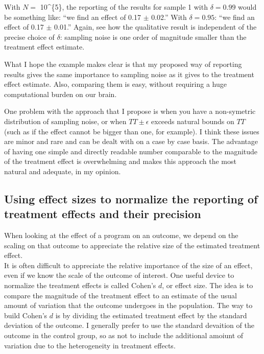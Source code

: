 \documentclass[]{book}
\theoremstyle{definition}
\theoremstyle{definition}
\theoremstyle{definition}
\theoremstyle{remark}
\let\BeginKnitrBlock\begin \let\EndKnitrBlock\end
\begin{document}
With \(N=\) 10\^{}\{5\}, the reporting of the results for sample 1 with
\(\delta=0.99\) would be something like: ``we find an effect of 0.17
\(\pm\) 0.02.'' With \(\delta=0.95\): ``we find an effect of 0.17
\(\pm\) 0.01.'' Again, see how the qualitative result is independent of
the precise choice of \(\delta\): sampling noise is one order of
magnitude smaller than the treatment effect estimate.

\BeginKnitrBlock{remark}
\iffalse{} {Remark. } \fi{}What I hope the example makes clear is that
my proposed way of reporting results gives the same importance to
sampling noise as it gives to the treatment effect estimate. Also,
comparing them is easy, without requiring a huge computational burden on
our brain.
\EndKnitrBlock{remark}

\BeginKnitrBlock{remark}
\iffalse{} {Remark. } \fi{}One problem with the approach that I propose
is when you have a non-symetric distribution of sampling noise, or when
\(TT \pm \epsilon\) exceeds natural bounds on \(TT\) (such as if the
effect cannot be bigger than one, for example). I think these issues are
minor and rare and can be dealt with on a case by case basis. The
advantage of having one simple and directly readable number comparable
to the magnitude of the treatment effect is overwhelming and makes this
approach the most natural and adequate, in my opinion.
\EndKnitrBlock{remark}

\subsection{Using effect sizes to normalize the reporting of treatment
effects and their
precision}\label{using-effect-sizes-to-normalize-the-reporting-of-treatment-effects-and-their-precision}

When looking at the effect of a program on an outcome, we depend on the
scaling on that outcome to appreciate the relative size of the estimated
treatment effect.\\
It is often difficult to appreciate the relative importance of the size
of an effect, even if we know the scale of the outcome of interest. One
useful device to normalize the treatment effects is called Cohen's
\(d\), or effect size. The idea is to compare the magnitude of the
treatment effect to an estimate of the usual amount of variation that
the outcome undergoes in the population. The way to build Cohen's \(d\)
is by dividing the estimated treatment effect by the standard deviation
of the outcome. I generally prefer to use the standard devaition of the
outcome in the control group, so as not to include the additional
amoiunt of variation due to the heterogeneity in treatment effects.
\end{document}
